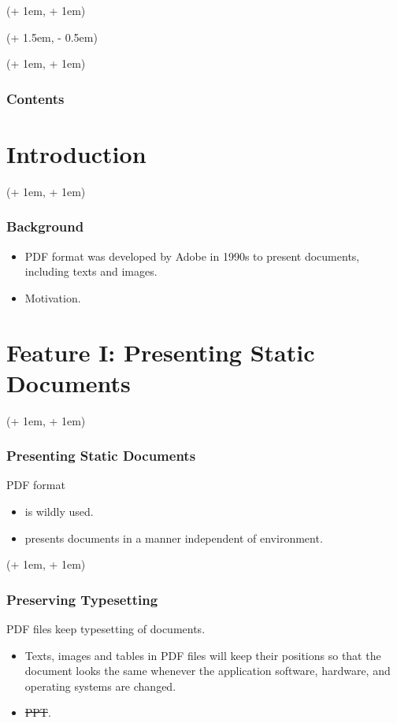 \documentclass[xcolor=dvipsnames]{beamer}
\title{\TITLE}
\author{\AUTHOR}
\date{\tdyear\dateseparator\tdmonth\dateseparator\tdday\hspace{1em}\tdtime}
\institute{\INSTITUTE}
\newcommand{\FrameTextCrono}[1]{
    \begin{textblock*}{\paperwidth}(\textwidth + 1em, \textheight + 1em)
        #1
    \end{textblock*}
}
\newcommand{\FrameTextResetCrono}[1]{
    \begin{textblock*}{\paperwidth}(\textwidth + 1.5em, \textheight - 0.5em)
        #1
    \end{textblock*}
}
\newcommand{\ResetCronoBox}{\resetcrono{\fbox{reset}}}
\let\oldframe\frame
\let\oldendframe\endframe
\renewenvironment{frame}
    {\oldframe\FrameTextCrono{\small\color{blue}{\crono}}}
    {\oldendframe}
\let\oldtitlepage\titlepage
\renewcommand{\titlepage}{\oldtitlepage\FrameTextResetCrono{\ResetCronoBox}}
\begin{document}

    \begin{frame}
        \initclock
        \titlepage
    \end{frame}


    \begin{frame}
        \frametitle{Contents}
        \tableofcontents
    \end{frame}


    \section{Introduction}

    \begin{frame}
        \frametitle{Background}
        \begin{itemize}
            \item PDF format was developed by Adobe in 1990s
                to present documents, including texts and images.
            \item Motivation.
        \end{itemize}
    \end{frame}

    \section{Feature I: Presenting Static Documents}

    \begin{frame}
        \frametitle{Presenting Static Documents}
        PDF format
        \begin{itemize}
            \item is wildly used.
            \item presents documents in a manner independent of environment.
        \end{itemize}
    \end{frame}

    \begin{frame}
        \frametitle{Preserving Typesetting}
        PDF files keep typesetting of documents.
        \begin{itemize}
            \item Texts, images and tables in PDF files will keep their positions
                so that the document looks the same
                whenever the application software, hardware,
                and operating systems are changed.
            \item \sout{PPT}.
        \end{itemize}
    \end{frame}
\end{document}
